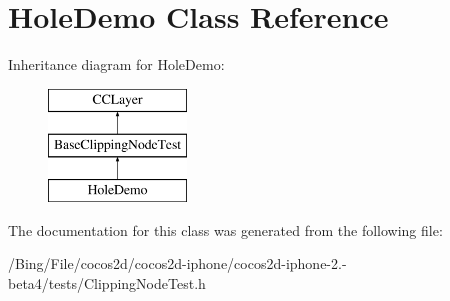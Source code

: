 \hypertarget{interface_hole_demo}{\section{Hole\-Demo Class Reference}
\label{interface_hole_demo}
}
Inheritance diagram for Hole\-Demo\-:\begin{figure}[H]
\begin{center}
\leavevmode
\includegraphics[height=3.000000cm]{interface_hole_demo}
\end{center}
\end{figure}


The documentation for this class was generated from the following file\-:\begin{DoxyCompactItemize}
\item 
/\-Bing/\-File/cocos2d/cocos2d-\/iphone/cocos2d-\/iphone-\/2.-\/beta4/tests/Clipping\-Node\-Test.\-h\end{DoxyCompactItemize}
